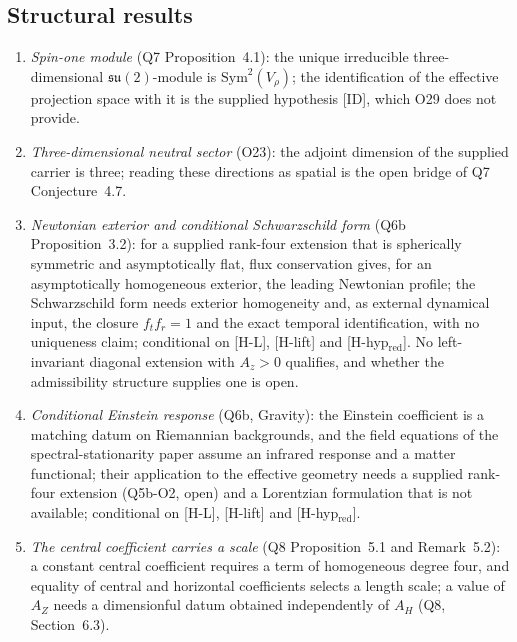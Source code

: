 \documentclass[11pt,a4paper]{article}
\theoremstyle{definition}
\newcommand{\su}{\mathfrak{su}}
\newcommand{\AH}{A_H}
\newcommand{\AZ}{A_Z}
\newcommand{\Sym}{\mathrm{Sym}}
\begin{document}
    \subsection{Structural results}
      \label{sec:structural}

      \begin{enumerate}
        \item \textit{Spin-one module} (Q7 Proposition~4.1): the unique irreducible
        three-dimensional $\su(2)$-module is $\Sym^2(V_\rho)$; the identification of the effective
        projection space with it is the supplied hypothesis [ID], which O29 does not provide.

        \item \textit{Three-dimensional neutral sector} (O23): the adjoint dimension of the
        supplied carrier is three; reading these directions as spatial is the open bridge of Q7
        Conjecture~4.7.

        \item \textit{Newtonian exterior and conditional Schwarzschild form} (Q6b Proposition~3.2): for
        a supplied rank-four extension that is spherically symmetric and asymptotically flat, flux
        conservation gives, for an asymptotically homogeneous exterior, the leading Newtonian profile; the
        Schwarzschild form needs exterior homogeneity and, as external dynamical input, the closure
        $f_t f_r = 1$ and the exact temporal identification, with no uniqueness claim; conditional on [H-L],
        [H-lift] and [H-hyp$_{\mathrm{red}}$].
        No left-invariant diagonal extension with $A_z > 0$ qualifies, and whether the admissibility structure
        supplies one is open.

        \item \textit{Conditional Einstein response} (Q6b, Gravity): the Einstein coefficient is a
        matching datum on Riemannian backgrounds, and the field equations of the spectral-stationarity
        paper assume an infrared response and a matter functional; their application to the effective
        geometry needs a supplied rank-four extension (Q5b-O2, open) and a Lorentzian formulation that is not
        available; conditional on [H-L], [H-lift] and [H-hyp$_{\mathrm{red}}$].

        \item \textit{The central coefficient carries a scale} (Q8 Proposition~5.1 and
        Remark~5.2): a constant central coefficient requires a term of homogeneous degree four,
        and equality of central and horizontal coefficients selects a length scale; a value of
        $\AZ$ needs a dimensionful datum obtained independently of $\AH$ (Q8, Section~6.3).
      \end{enumerate}
\end{document}

